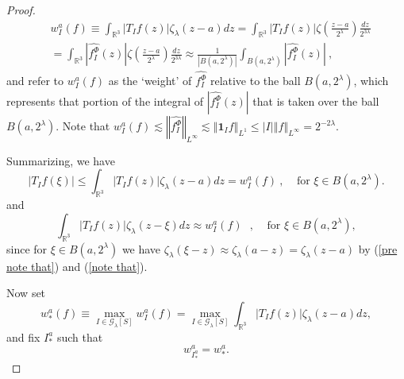 \documentclass{amsart}%
\theoremstyle{plain}
\numberwithin{equation}{section}
\begin{document}
\begin{proof}
\begin{align*}
&  w_{I}^{a}\left(  f\right)  \equiv\int_{\mathbb{R}^{3}}\left\vert
T_{I}f\left(  z\right)  \right\vert \zeta_{\lambda}\left(  z-a\right)
dz=\int_{\mathbb{R}^{3}}\left\vert T_{I}f\left(  z\right)  \right\vert
\zeta\left(  \frac{z-a}{2^{\lambda}}\right)  \frac{dz}{2^{3\lambda}}\\
&  =\int_{\mathbb{R}^{3}}\left\vert \widehat{f_{I}^{\Phi}}\left(  z\right)
\right\vert \zeta\left(  \frac{z-a}{2^{\lambda}}\right)  \frac{dz}%
{2^{3\lambda}}\approx\frac{1}{\left\vert B\left(  a,2^{\lambda}\right)
\right\vert }\int_{B\left(  a,2^{\lambda}\right)  }\left\vert \widehat
{f_{I}^{\Phi}}\left(  z\right)  \right\vert \ ,
\end{align*}
and refer to $w_{I}^{a}\left(  f\right)  $ as the `weight' of $\widehat
{f_{I}^{\Phi}}$ relative to the ball $B\left(  a,2^{\lambda}\right)  $, which
represents that portion of the integral of $\left\vert \widehat{f_{I}^{\Phi}%
}\left(  z\right)  \right\vert $ that is taken over the ball $B\left(
a,2^{\lambda}\right)  $. Note that $w_{I}^{a}\left(  f\right)  \lesssim
\left\Vert \widehat{f_{I}^{\Phi}}\right\Vert _{L^{\infty}}\lesssim\left\Vert
\mathbf{1}_{I}f\right\Vert _{L^{1}}\leq\left\vert I\right\vert \left\Vert
f\right\Vert _{L^{\infty}}=2^{-2\lambda}$.

Summarizing, we have%
\begin{equation}
\left\vert T_{I}f\left(  \xi\right)  \right\vert \leq\int_{\mathbb{R}^{3}%
}\left\vert T_{I}f\left(  z\right)  \right\vert \zeta_{\lambda}\left(
z-a\right)  dz=w_{I}^{a}\left(  f\right)  \ ,\ \ \ \ \ \text{for }\xi\in
B\left(  a,2^{\lambda}\right)  .\label{pre exclaim'}%
\end{equation}
and
\begin{equation}
\int_{\mathbb{R}^{3}}\left\vert T_{I}f\left(  z\right)  \right\vert
\zeta_{\lambda}\left(  z-\xi\right)  dz\approx w_{I}^{a}\left(  f\right)
\text{ },\ \ \ \ \ \text{for }\xi\in B\left(  a,2^{\lambda}\right)
,\label{exclaim'}%
\end{equation}
since for $\xi\in B\left(  a,2^{\lambda}\right)  $ we have $\zeta_{\lambda
}\left(  \xi-z\right)  \approx\zeta_{\lambda}\left(  a-z\right)
=\zeta_{\lambda}\left(  z-a\right)  $ by (\ref{pre note that}) and
(\ref{note that}).

Now set%
\[
w_{\ast}^{a}\left(  f\right)  \equiv\max_{I\in\mathcal{G}_{\lambda}\left[
S\right]  }w_{I}^{a}\left(  f\right)  =\max_{I\in\mathcal{G}_{\lambda}\left[
S\right]  }\int_{\mathbb{R}^{3}}\left\vert T_{I}f\left(  z\right)  \right\vert
\zeta_{\lambda}\left(  z-a\right)  dz,
\]
and fix $I_{\ast}^{a}$ such that
\[
w_{I_{\ast}^{a}}^{a}=w_{\ast}^{a}.
\]



\end{proof}
\end{document}
